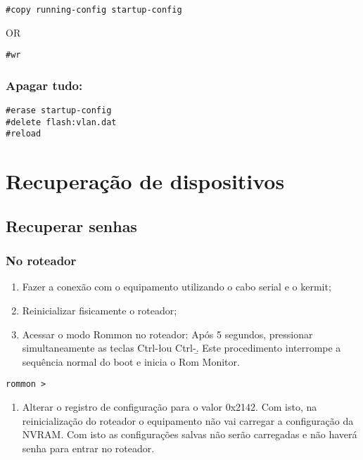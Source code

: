 \documentclass[]{article}
\begin{document}
\begin{verbatim}
#copy running-config startup-config 
\end{verbatim}

OR

\begin{verbatim}
#wr 
\end{verbatim}

\subsubsection{Apagar tudo:}\label{apagar-tudo}

\begin{verbatim}
#erase startup-config 
#delete flash:vlan.dat 
#reload 
\end{verbatim}

\section{Recuperação de
dispositivos}\label{recuperauxe7uxe3o-de-dispositivos}

\subsection{Recuperar senhas}\label{recuperar-senhas}

\subsubsection{No roteador}\label{no-roteador}

\begin{enumerate}
\def\labelenumi{\arabic{enumi}.}
\item
  Fazer a conexão com o equipamento utilizando o cabo serial e o kermit;
\item
  Reinicializar fisicamente o roteador;
\item
  Acessar o modo Rommon no roteador: Após 5 segundos, pressionar
  simultaneamente as teclas Ctrl-\l ou Ctrl-\b. Este procedimento
  interrompe a sequência normal do boot e inicia o Rom Monitor.
\end{enumerate}

\begin{verbatim}
rommon >
\end{verbatim}

\begin{enumerate}
\def\labelenumi{\arabic{enumi}.}
\setcounter{enumi}{3}
\itemsep1pt\parskip0pt
\item
  Alterar o registro de configuração para o valor 0x2142. Com isto, na
  reinicialização do roteador o equipamento não vai carregar a
  configuração da NVRAM. Com isto as configurações salvas não serão
  carregadas e não haverá senha para entrar no roteador.
\end{enumerate}
\end{document}
